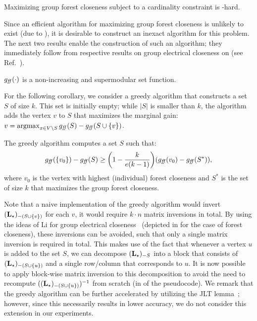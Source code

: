 \begin{theorem}
\label{theo:el-clos:gfc-nph}
Maximizing group forest closeness subject to a cardinality constraint
is \np-hard.
\end{theorem}

Since an efficient algorithm for maximizing group forest closeness is unlikely
to exist (due to ), it is desirable to construct an
inexact algorithm for this problem.
The next two results enable the construction of such an algorithm; they immediately
follow from respective results on group electrical closeness on \gstar
(see Ref.~\cite[Theorems 5.4 and 6.1]{DBLP:conf/www/0002PSYZ19}).

\begin{lemma}
$g_{\mathit{ff}}(\cdot)$ is a non-increasing and supermodular set function.
\end{lemma}

For the following corollary, we consider a greedy algorithm that constructs a set $S$
of size $k$. This set is initially empty; while $|S|$  is smaller than $k$, the algorithm
adds the vertex $v$ to $S$ that maximizes the marginal gain:
$v = \argmax_{x \in V \setminus S}\gffarn(S) - \gffarn(S \cup \set{v})$.

\begin{corollary}
The greedy algorithm computes a set $S$ such that:
%
\[
\gffarn(\set{v_0}) - \gffarn(S) \ge
\roundb{1 - \frac{k}{e(k - 1)}}\roundb{\gffarn(v_0) - \gffarn(S^*)},
\]
%
where $v_0$ is the vertex with highest (individual) forest closeness and $S^*$
is the set of size $k$ that maximizes the group forest closeness.
\end{corollary}



Note that a naive implementation of the greedy algorithm would invert
$(\Lstar)_{-(S\cup\set{v})}$ for each $v$, \ie it would require $k\cdot n$
matrix inversions in total.
By using the ideas of Li \etal for group electrical
closeness~\cite{DBLP:conf/www/0002PSYZ19} (depicted in 
for the case of forest closeness), these inversions can be avoided,
such that only a single matrix inversion is required in total.
This makes use of the fact that whenever a vertex $u$ is added to the set $S$,
we can decompose $(\mathbf{L_{\star}})_{-S}$ into a block that consists of
$(\Lstar)_{-(S\cup\set{u})}$ and a single row/column that corresponds to $u$.
It is now possible to apply block-wise matrix inversion to this decomposition
to avoid the need to recompute $((\Lstar)_{-(S \cup \set{u})})^{-1}$ from scratch
(in  of the pseudocode).
We remark that the greedy algorithm can be further accelerated by utilizing the
JLT lemma~\cite{DBLP:conf/www/0002PSYZ19}; however, since this necessarily
results in lower accuracy, we do not consider this extension in our experiments.

